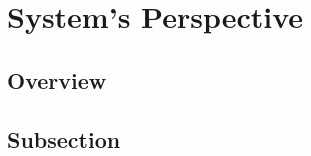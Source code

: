 \section{System's Perspective}
\label{sec:systems_perspective}

\subsection{Overview}
\label{subsec:systems_perspective_overview}

\subsection{Subsection}
